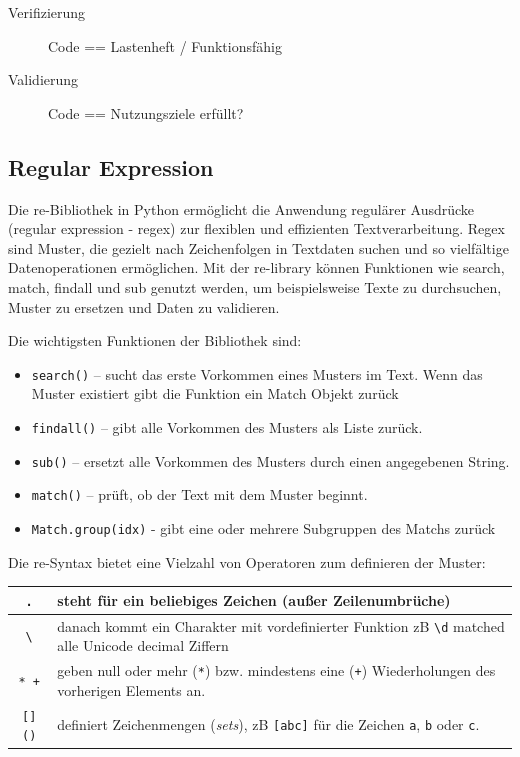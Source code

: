 \documentclass[a4paper, 12pt]{article}
\begin{document}
\begin{description}
	\item[Verifizierung] Code == Lastenheft / Funktionsfähig %
	
	\item[Validierung] Code == Nutzungsziele erfüllt? %

\end{description}


\subsection{Regular Expression}\label{regularExpression}
Die re-Bibliothek in Python ermöglicht die Anwendung regulärer Ausdrücke (regular expression - regex) zur flexiblen und effizienten Textverarbeitung. Regex sind Muster, die gezielt nach Zeichenfolgen in Textdaten suchen und so vielfältige Datenoperationen ermöglichen. Mit der re-library können Funktionen wie search, match, findall und sub genutzt werden, um beispielsweise Texte zu durchsuchen, Muster zu ersetzen und Daten zu validieren. \cite{regex_lib}

Die wichtigsten Funktionen der Bibliothek sind:
\begin{itemize}
    \item \texttt{search()} – sucht das erste Vorkommen eines Musters im Text. Wenn das Muster existiert gibt die Funktion ein Match Objekt zurück
    \item \texttt{findall()} – gibt alle Vorkommen des Musters als Liste zurück.
    \item \texttt{sub()} – ersetzt alle Vorkommen des Musters durch einen angegebenen String.
    \item \texttt{match()} – prüft, ob der Text mit dem Muster beginnt.
    	\item \texttt{Match.group(idx)} - gibt eine oder mehrere Subgruppen des Matchs zurück
\end{itemize}

\newpage
Die re-Syntax bietet eine Vielzahl von Operatoren zum definieren der Muster:
\begin{table}[h!]
\centering
\begin{tabular}{|c | >{\arraybackslash}p{11cm}|}
\hline
\texttt{.} & steht für ein beliebiges Zeichen (außer Zeilenumbrüche) \\
\hline
\texttt{\textbackslash} & danach kommt ein Charakter mit vordefinierter Funktion zB \texttt{\textbackslash d}  matched
	alle Unicode decimal Ziffern \\
\hline
\texttt{* +} & geben null oder mehr (\texttt{*}) bzw. mindestens 
	eine (\texttt{+}) Wiederholungen des vorherigen Elements an. \\
\hline
\texttt{[] ()} & definiert Zeichenmengen (\textit{sets}), zB \texttt{[abc]} für die Zeichen 	 
	\texttt{a}, \texttt{b} oder \texttt{c}. \\
\hline
\end{tabular}
\end{table}
\end{document}
